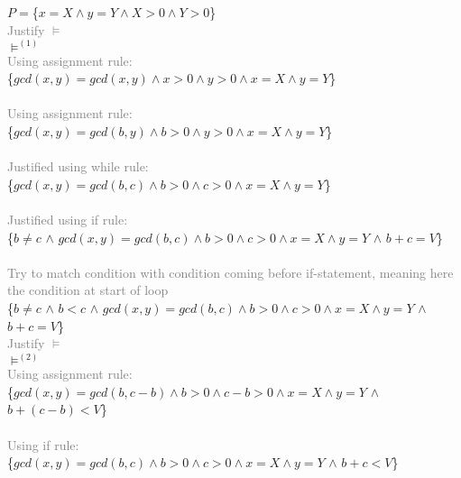 \documentclass[11.5pt]{article}
\begin{document}
\begin{enumerate}
    $P=$\{$x=X \land y=Y\land X > 0 \land Y >0$\}
    \\  \textcolor{gray}{Justify $\vDash$} \\
    $\vDash^{(1)}$ \\ 
    \textcolor{gray}{Using assignment rule:} \\
    \{$gcd(x,y)=gcd(x,y) \land x >0 \land y > 0 \land x=X \land y=Y$\}
    \\
     \\
    \textcolor{gray}{Using assignment rule:} \\
    \{$gcd(x,y)=gcd(b,y) \land b >0 \land y > 0 \land x=X \land y=Y$\}
    \\
     \\
    \textcolor{gray}{Justified using while rule:} \\
    \{\colorbox{blue!10}{$gcd(x,y)=gcd(b,c) \land b >0 \land c > 0 \land x=X \land y=Y$}\}
    \\
     \\
    \textcolor{gray}{Justified using if rule:} \\
    \{\colorbox{magenta!10}{$b \neq c$} $\land$ \colorbox{blue!10}{$gcd(x,y)=gcd(b,c) \land b >0 \land c > 0 \land x=X \land y=Y$}
    $\land$ \colorbox{teal!10}{$b+c = V$}\}
    \\
     \\
    \textcolor{gray}{Try to match condition with condition coming before if-statement, meaning here the condition at start of loop} \\
    \{\colorbox{magenta!10}{$b \neq c$} $\land$ \colorbox{NavyBlue!10}{$b<c$} $\land$ \colorbox{blue!10}{$gcd(x,y)=gcd(b,c) \land b > 0 \land c > 0 \land x=X \land y=Y$}
    $\land$ \colorbox{teal!10}{$b+c = V$}\} 
    \\  \textcolor{gray}{Justify $\vDash$} \\
    $\vDash^{(2)}$ \\
    \textcolor{gray}{Using assignment rule:} \\
    \{$gcd(x,y)=gcd(b,c-b) \land b > 0 \land c-b > 0 \land x=X \land y=Y$ $\land$ \colorbox{teal!10}{$b+(c-b) < V$}\} 
    \\
     \\
    \textcolor{gray}{Using if rule:} \\
    \{$gcd(x,y)=gcd(b,c) \land b >0 \land c > 0 \land x=X \land y=Y$ $\land$ \colorbox{teal!10}{$b+c < V$}\} 

\end{enumerate}
\end{document}
